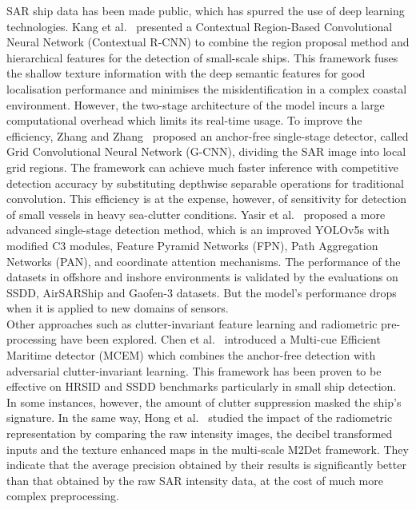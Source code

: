 SAR ship data has been made public, which has spurred the use of deep learning technologies. Kang et al.~\cite{rs9080860} presented a Contextual Region-Based Convolutional Neural Network (Contextual R-CNN) to combine the region proposal method and hierarchical features for the detection of small-scale ships. This framework fuses the shallow texture information with the deep semantic features for good localisation performance and minimises the misidentification in a complex coastal environment. However, the two-stage architecture of the model incurs a large computational overhead which limits its real-time usage.
To improve the efficiency, Zhang and Zhang~\cite{rs11101206} proposed an anchor-free single-stage detector, called Grid Convolutional Neural Network (G-CNN), dividing the SAR image into local grid regions. The framework can achieve much faster inference with competitive detection accuracy by substituting depthwise separable operations for traditional convolution. This efficiency is at the expense, however, of sensitivity for detection of small vessels in heavy sea-clutter conditions.
Yasir et al.~\cite{10.3389/fmars.2022.1086140} proposed a more advanced single-stage detection method, which is an improved YOLOv5s with modified C3 modules, Feature Pyramid Networks (FPN), Path Aggregation Networks (PAN), and coordinate attention mechanisms. The performance of the datasets in offshore and inshore environments is validated by the evaluations on SSDD, AirSARShip and Gaofen-3 datasets. But the model's performance drops when it is applied to new domains of sensors.\\

Other approaches such as clutter-invariant feature learning and radiometric pre-processing have been explored. Chen et al.~\cite{s25185736} introduced a Multi-cue Efficient Maritime detector (MCEM) which combines the anchor-free detection with adversarial clutter-invariant learning. This framework has been proven to be effective on HRSID and SSDD benchmarks particularly in small ship detection.
In some instances, however, the amount of clutter suppression masked the ship's signature. In the same way, Hong et al.~\cite{app10217751} studied the impact of the radiometric representation by comparing the raw intensity images, the decibel transformed inputs and the texture enhanced maps in the multi-scale M2Det framework. They indicate that the average precision obtained by their results is significantly better than that obtained by the raw SAR intensity data, at the cost of much more complex preprocessing.\\

